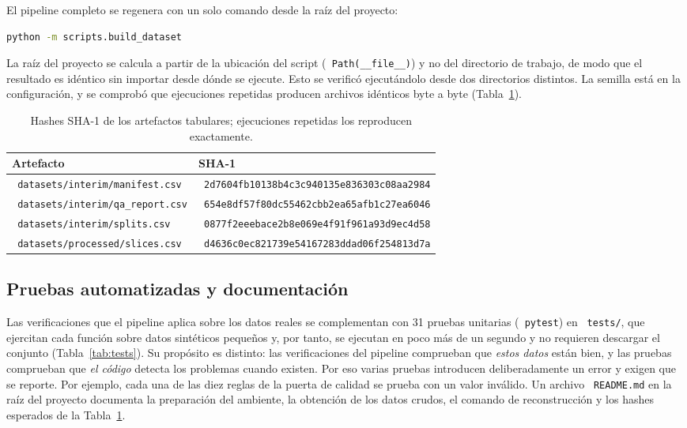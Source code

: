 \documentclass[12pt,letterpaper]{article}
\newcommand{\code}[1]{\texttt{\hyphenchar\font=-1 #1}}
\begin{document}
El pipeline completo se regenera con un solo comando desde la raíz del proyecto:

\begin{lstlisting}[language=bash, numbers=none]
python -m scripts.build_dataset
\end{lstlisting}

\noindent La raíz del proyecto se calcula a partir de la ubicación del script (\code{Path(\_\_file\_\_)}) y no del directorio de trabajo, de modo que el resultado es idéntico sin importar desde dónde se ejecute. Esto se verificó ejecutándolo desde dos directorios distintos. La semilla está en la configuración, y se comprobó que ejecuciones repetidas producen archivos idénticos byte a byte (Tabla~\ref{tab:hashes}).

\begin{table}[!htbp]
\centering
\small
\caption{Hashes SHA-1 de los artefactos tabulares; ejecuciones repetidas los reproducen exactamente.}
\label{tab:hashes}
\begin{tabular}{ll}
\toprule
Artefacto & SHA-1 \\
\midrule
\code{datasets/interim/manifest.csv} & \code{2d7604fb10138b4c3c940135e836303c08aa2984} \\
\code{datasets/interim/qa\_report.csv} & \code{654e8df57f80dc55462cbb2ea65afb1c27ea6046} \\
\code{datasets/interim/splits.csv} & \code{0877f2eeebace2b8e069e4f91f961a93d9ec4d58} \\
\code{datasets/processed/slices.csv} & \code{d4636c0ec821739e54167283ddad06f254813d7a} \\
\bottomrule
\end{tabular}
\end{table}

\subsection{Pruebas automatizadas y documentación}

Las verificaciones que el pipeline aplica sobre los datos reales se complementan con 31 pruebas unitarias (\code{pytest}) en \code{tests/}, que ejercitan cada función sobre datos sintéticos pequeños y, por tanto, se ejecutan en poco más de un segundo y no requieren descargar el conjunto (Tabla~\ref{tab:tests}). Su propósito es distinto: las verificaciones del pipeline comprueban que \emph{estos datos} están bien, y las pruebas comprueban que \emph{el código} detecta los problemas cuando existen. Por eso varias pruebas introducen deliberadamente un error y exigen que se reporte. Por ejemplo, cada una de las diez reglas de la puerta de calidad se prueba con un valor inválido. Un archivo \code{README.md} en la raíz del proyecto documenta la preparación del ambiente, la obtención de los datos crudos, el comando de reconstrucción y los hashes esperados de la Tabla~\ref{tab:hashes}.
\end{document}
